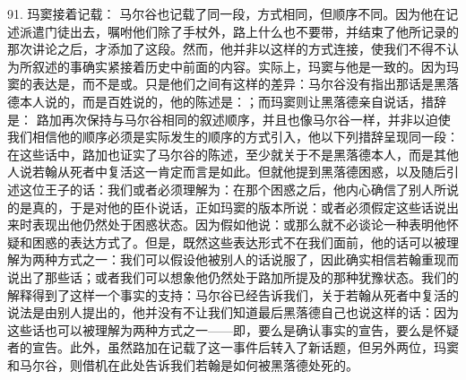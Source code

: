 91. 玛窦接着记载： 马尔谷也记载了同一段，方式相同，但顺序不同。因为他在记述派遣门徒出去，嘱咐他们除了手杖外，路上什么也不要带，并结束了他所记录的那次讲论之后，才添加了这段。然而，他并非以这样的方式连接，使我们不得不认为所叙述的事确实紧接着历史中前面的内容。实际上，玛窦与他是一致的。因为玛窦的表达是，而不是或。只是他们之间有这样的差异：马尔谷没有指出那话是黑落德本人说的，而是百姓说的，他的陈述是：；而玛窦则让黑落德亲自说话，措辞是： 路加再次保持与马尔谷相同的叙述顺序，并且也像马尔谷一样，并非以迫使我们相信他的顺序必须是实际发生的顺序的方式引入，他以下列措辞呈现同一段： 在这些话中，路加也证实了马尔谷的陈述，至少就关于不是黑落德本人，而是其他人说若翰从死者中复活这一肯定而言是如此。但就他提到黑落德困惑，以及随后引述这位王子的话：我们或者必须理解为：在那个困惑之后，他内心确信了别人所说的是真的，于是对他的臣仆说话，正如玛窦的版本所说：或者必须假定这些话说出来时表现出他仍然处于困惑状态。因为假如他说：或那么就不必谈论一种表明他怀疑和困惑的表达方式了。但是，既然这些表达形式不在我们面前，他的话可以被理解为两种方式之一：我们可以假设他被别人的话说服了，因此确实相信若翰重现而说出了那些话；或者我们可以想象他仍然处于路加所提及的那种犹豫状态。我们的解释得到了这样一个事实的支持：马尔谷已经告诉我们，关于若翰从死者中复活的说法是由别人提出的，他并没有不让我们知道最后黑落德自己也说这样的话：因为这些话也可以被理解为两种方式之一——即，要么是确认事实的宣告，要么是怀疑者的宣告。此外，虽然路加在记载了这一事件后转入了新话题，但另外两位，玛窦和马尔谷，则借机在此处告诉我们若翰是如何被黑落德处死的。\par


